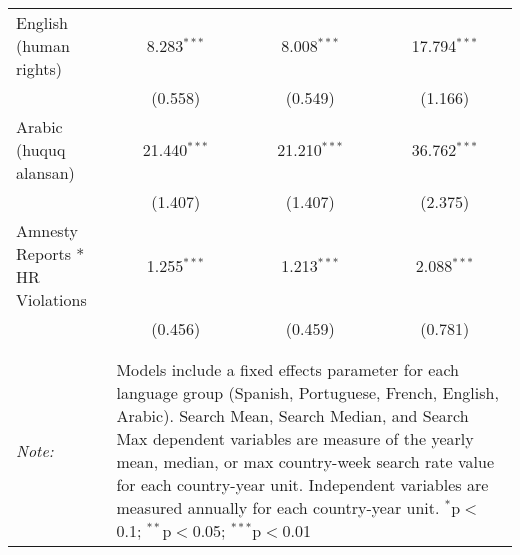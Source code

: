 \begin{table}[!htbp]
\begin{tabular}{@{\extracolsep{5pt}}lccc}
  English (human rights) & 8.283$^{***}$ & 8.008$^{***}$ & 17.794$^{***}$ \\ 
  & (0.558) & (0.549) & (1.166) \\ 
  Arabic (huquq alansan) & 21.440$^{***}$ & 21.210$^{***}$ & 36.762$^{***}$ \\ 
  & (1.407) & (1.407) & (2.375) \\ 
  Amnesty Reports * HR Violations & 1.255$^{***}$ & 1.213$^{***}$ & 2.088$^{***}$ \\ 
  & (0.456) & (0.459) & (0.781) \\ 
 \hline \\[-1.8ex] 
\hline 
\hline \\[-1.8ex] 
\textit{Note:}  & \multicolumn{3}{l}{\parbox[t]{8cm}{Models include a fixed effects parameter for each language group (Spanish, Portuguese, French, English, Arabic). Search Mean, Search Median, and Search Max dependent variables are measure of the yearly mean, median, or max country-week search rate value for each country-year unit. Independent variables are measured annually for each country-year unit. $^{*}$p$<$0.1; $^{**}$p$<$0.05; $^{***}$p$<$0.01}} \\ 
\end{tabular} 
\end{table} 
